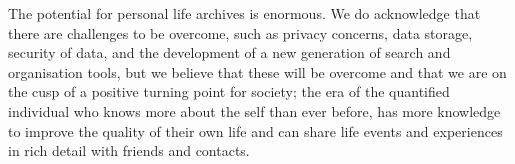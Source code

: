 The potential for personal life archives is enormous. We do acknowledge that there are  challenges to be overcome, such as privacy concerns, data storage, security of data, and the development of a new generation of search and organisation tools, but we believe that these will be overcome and that we are on the cusp of a positive turning point for society; the era of the quantified individual who knows more about the self than ever before, has more knowledge to improve the quality of their own life and can share life events and experiences in rich detail with friends and contacts.
